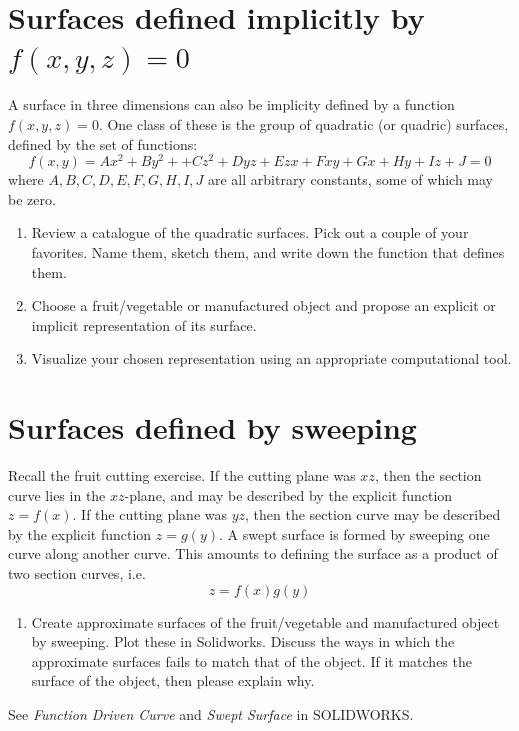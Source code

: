 \documentclass{tufte-handout}
\begin{document}
\section{Surfaces defined implicitly by $f(x,y,z) = 0$}
A surface in three dimensions can also be implicity defined by a function $f(x,y,z) = 0$.  One class of these is the group of quadratic (or quadric) surfaces, defined by the set of functions:
\[f(x,y) = Ax^2 + By^2+ +Cz^2 + Dyz + Ezx+Fxy+Gx+Hy+Iz+J=0\]
where $A,B,C,D,E,F,G,H,I,J$ are all arbitrary constants, some of which may be zero.

\begin{enumerate}[resume]
\item Review a catalogue of the quadratic surfaces. Pick out a couple of your favorites. Name them, sketch them, and write down the function that defines them.
\item Choose a fruit/vegetable or manufactured object and propose an explicit or implicit representation of its surface.
\item Visualize your chosen representation using an appropriate computational tool.
\end{enumerate}

\section{Surfaces defined by sweeping}

Recall the fruit cutting exercise. If the cutting plane was $xz$, then the section curve lies in the $xz$-plane, and may be described by the explicit function $z=f(x)$. If the cutting plane was $yz$, then the section curve may be described by the explicit function $z = g(y)$. A swept surface is formed by sweeping one curve along another curve. This amounts to defining the surface as a product of two section curves, i.e.
\[z = f(x) g(y) \]


\begin{enumerate}[resume]
\item Create approximate surfaces of the fruit/vegetable and manufactured object by sweeping. Plot these in Solidworks. Discuss the ways in which the approximate surfaces fails to match that of the object. If it matches the surface of the object, then please explain why.
\end{enumerate}

See {\it Function Driven Curve} and {\it Swept Surface} in SOLIDWORKS.
\end{document}
